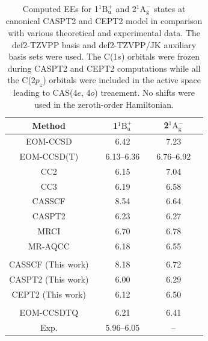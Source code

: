 \documentclass[aip,jcp,amsmath]{revtex4-1}
\begin{document}
{
\begin{longtable}[!ht]{cccccc}
  \caption{\label{tab:butadiene}
    Computed EEs for 1${}^1\text{B}_\text{u}^{+}$ and 2${}^1\text{A}_\text{g}^{-}$ states at canonical CASPT2 and CEPT2 model in comparison with various theoretical and experimental data.
    The def2-TZVPP basis and def2-TZVPP/JK auxiliary basis sets were used.
    The C(1$s$) orbitals were frozen during CASPT2 and CEPT2 computations while all the C(2$p_z$) orbitals were included in the active space leading to CAS(4$e$, 4$o$) treaement.
    No shifts were used in the zeroth-order Hamiltonian.
}
\\
\hline
\hline
Method && 1${}^1\text{B}_\text{u}^{+}$ && 2${}^1\text{A}_\text{g}^{-}$ \\
\hline

EOM-CCSD\cite{doi:10.1063/1.471988}    && 6.42       && 7.23       \\
EOM-CCSD(T)\cite{doi:10.1063/1.471988} && 6.13--6.36 && 6.76--6.92 \\
CC2\cite{doi:10.1063/1.3158990}        && 6.15       && 7.04       \\
CC3\cite{doi:10.1063/1.3158990}        && 6.19       && 6.58       \\
CASSCF\cite{doi:10.1063/1.465071}      && 8.54       && 6.64       \\
CASPT2\cite{doi:10.1063/1.465071}      && 6.23       && 6.27       \\
MRCI\cite{SZALAY1989219}               && 6.70       && 6.78       \\
MR-AQCC\cite{Dallos2004}               && 6.18       && 6.55       \\
\\
CASSCF (This work)      && 8.18       && 6.72       \\
CASPT2 (This work)      && 6.00       && 6.29       \\
CEPT2 (This work)       && 6.12       && 6.50       \\
\\
EOM-CCSDTQ\cite{doi:10.1021/ct300591z} && 6.21       && 6.41 \\
Exp.\cite{doi:10.1063/1.440587}        && 5.96--6.05 && --   \\
\hline
\hline
\end{longtable}

}
\end{document}
